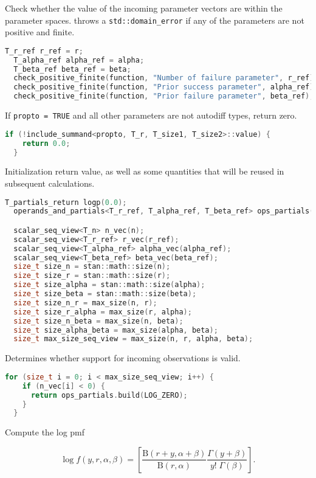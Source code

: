 \documentclass[11pt]{article}
\begin{document}
Check whether the value of the incoming parameter vectors are within the parameter spaces.  throws a \verb|std::domain_error| if any of the parameters are not positive and finite.
\begin{lstlisting}[language=c++, style=lgeneral]
  T_r_ref r_ref = r;
  T_alpha_ref alpha_ref = alpha;
  T_beta_ref beta_ref = beta;
  check_positive_finite(function, "Number of failure parameter", r_ref);
  check_positive_finite(function, "Prior success parameter", alpha_ref);
  check_positive_finite(function, "Prior failure parameter", beta_ref);
\end{lstlisting}

If \verb|propto = TRUE| and all other parameters are not autodiff types, return zero.
\begin{lstlisting}[language=c++, style=lgeneral]
  if (!include_summand<propto, T_r, T_size1, T_size2>::value) {
    return 0.0;
  }
\end{lstlisting}


Initialization return value, as well as some quantities that will be reused in subsequent calculations.
\begin{lstlisting}[language=c++, style=lgeneral]
  T_partials_return logp(0.0);
  operands_and_partials<T_r_ref, T_alpha_ref, T_beta_ref> ops_partials(r_ref, alpha_ref, beta_ref);

  scalar_seq_view<T_n> n_vec(n);
  scalar_seq_view<T_r_ref> r_vec(r_ref);
  scalar_seq_view<T_alpha_ref> alpha_vec(alpha_ref);
  scalar_seq_view<T_beta_ref> beta_vec(beta_ref);
  size_t size_n = stan::math::size(n);
  size_t size_r = stan::math::size(r);
  size_t size_alpha = stan::math::size(alpha);
  size_t size_beta = stan::math::size(beta);
  size_t size_n_r = max_size(n, r);
  size_t size_r_alpha = max_size(r, alpha);
  size_t size_n_beta = max_size(n, beta);
  size_t size_alpha_beta = max_size(alpha, beta);
  size_t max_size_seq_view = max_size(n, r, alpha, beta);
\end{lstlisting}


Determines whether support for incoming observations is valid.
\begin{lstlisting}[language=c++, style=lgeneral]
  for (size_t i = 0; i < max_size_seq_view; i++) {
    if (n_vec[i] < 0) {
      return ops_partials.build(LOG_ZERO);
    }
  }
\end{lstlisting}

Compute the log pmf

\begin{equation}
  \log f(y, r, \alpha ,\beta)= \left[ \frac {\mathrm {B} (r+y,\alpha +\beta )}{\mathrm {B} (r,\alpha )} \frac {\Gamma (y+\beta )}{y!\;\Gamma (\beta )} \right].
\end{equation}
\end{document}
